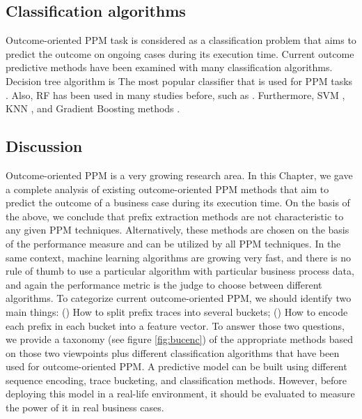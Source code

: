 \subsection{Classification algorithms}
Outcome-oriented PPM task is considered as a classification problem that aims to predict the outcome on ongoing cases during its execution time. Current outcome predictive methods have been examined with many classification algorithms. Decision tree algorithm is The most popular classifier that is used for PPM tasks \cite{de2016general, grigori2001improving, maggi2014predictive}. Also, RF has been used in many studies before, such as \cite{leontjeva2016complex, ghattas2014improving}. Furthermore, SVM \cite{schwegmann2013method}, KNN \cite{van2012process}, and Gradient Boosting methods \cite{teinemaa2019outcome}. 

\subsection{Discussion}
Outcome-oriented PPM is a very growing research area. In this Chapter, we gave a complete analysis of existing outcome-oriented PPM methods that aim to predict the outcome of a business case during its execution time. On the basis of the above, we conclude that prefix extraction methods are  not characteristic to any given PPM techniques. Alternatively, these methods are chosen on the basis of the performance measure and can be utilized by all PPM techniques. In the same context, machine learning algorithms are growing very fast, and there is no rule of thumb to use a particular algorithm with particular business process data, and again the performance metric is the judge to choose between different algorithms. 
To categorize current outcome-oriented PPM, we should identify two main things: () How to split prefix traces into several buckets; () How to encode each prefix in each bucket into a feature vector.  To answer those two questions, we provide a taxonomy (see figure \ref{fig:bucenc}) of the appropriate methods based on those two viewpoints plus different classification algorithms that have been used for outcome-oriented PPM. A predictive model can be built using different sequence encoding, trace bucketing, and classification methods. However, before deploying this model in a real-life environment, it should be evaluated to measure the power of it in real business cases.

